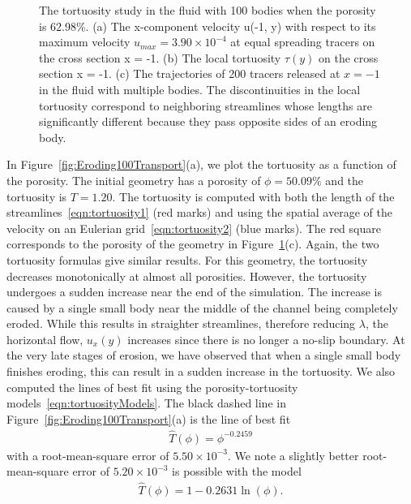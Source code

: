 \documentclass[preprint,10pt]{elsarticle}
\begin{document}
\begin{figure}[H]
\begin{subfigure}[b]{0.5\textwidth}
\caption{}
\end{subfigure}
\caption{\label{fig:Eroding100tort} The tortuosity study in the fluid
with 100 bodies when the porosity is 62.98\%.  (a) The x-component
velocity u(-1, y) with respect to its maximum velocity $u_{max}=3.90
\times 10^{-4}$ at equal spreading tracers on the cross section x = -1.
(b) The local tortuosity $\tau(y)$ on the cross section x = -1. (c) The
trajectories of 200 tracers released at $x = -1$ in the fluid with
multiple bodies.  The discontinuities in the local tortuosity correspond
to neighboring streamlines whose lengths are significantly different
because they pass opposite sides of an eroding body.}
\end{figure}

In Figure~\ref{fig:Eroding100Transport}(a), we plot the tortuosity as a
function of the porosity.  The initial geometry has a porosity of $\phi
= 50.09\%$ and the tortuosity is $T = 1.20$.  The tortuosity is computed
with both the length of the streamlines~\eqref{eqn:tortuosity1} (red
marks) and using the spatial average of the velocity on an Eulerian
grid~\eqref{eqn:tortuosity2} (blue marks).  The red square corresponds
to the porosity of the geometry in Figure~\ref{fig:Eroding100tort}(c).
Again, the two tortuosity formulas give similar results.  For this
geometry, the tortuosity decreases monotonically at almost all
porosities.  However, the tortuosity undergoes a sudden increase near
the end of the simulation.  The increase is caused by a single small
body near the middle of the channel being completely eroded.  While this
results in straighter streamlines, therefore reducing $\lambda$, the
horizontal flow, $u_x(y)$ increases since there is no longer a no-slip
boundary.  At the very late stages of erosion, we have observed that
when a single small body finishes eroding, this can result in a sudden
increase in the tortuosity.  We also computed the lines of best fit
using the porosity-tortuosity models~\eqref{eqn:tortuosityModels}.  The
black dashed line in Figure~\ref{fig:Eroding100Transport}(a) is the line
of best fit
\begin{align}
  \widehat{T}(\phi) = \phi^{-0.2459}
\end{align}
with a root-mean-square error of $5.50 \times 10^{-3}$.  We note a
slightly better root-mean-square error of $5.20 \times 10^{-3}$ is
possible with the model
\begin{align}
  \widehat{T}(\phi) = 1 - 0.2631 \ln(\phi).
\end{align}
\end{document}
